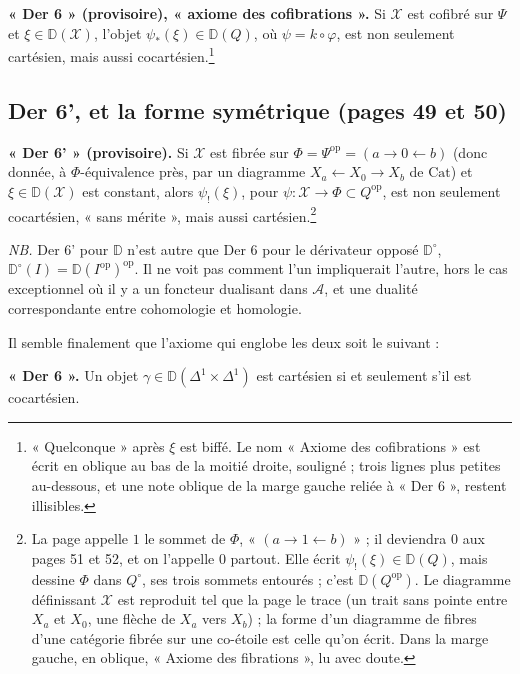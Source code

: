 \documentclass[11pt,a4paper]{article}
\begin{document}
\textbf{« Der 6 » (provisoire), « axiome des cofibrations ».} Si
$\mathcal{X}$ est cofibré sur $\Psi$ et $\xi \in \mathbb D(\mathcal{X})$,
l'objet $\psi_*(\xi) \in \mathbb D(Q)$, où $\psi = k \circ \varphi$, est non
seulement cartésien, mais aussi cocartésien.\footnote{« Quelconque » après
$\xi$ est biffé. Le nom « Axiome des cofibrations » est écrit en oblique au
bas de la moitié droite, souligné ; trois lignes plus petites au-dessous, et
une note oblique de la marge gauche reliée à « Der 6 », restent illisibles.}

\subsection*{Der 6', et la forme symétrique (pages 49 et 50)}

\textbf{« Der 6' » (provisoire).} Si $\mathcal{X}$ est fibrée sur
$\Phi = \Psi^{\mathrm{op}} = (a \to 0 \leftarrow b)$ (donc donnée, à
$\Phi$-équivalence près, par un diagramme $X_a \leftarrow X_0 \rightarrow X_b$
de $\mathrm{Cat}$) et $\xi \in \mathbb D(\mathcal{X})$ est constant, alors
$\psi_!(\xi)$, pour $\psi : \mathcal{X} \to \Phi \subset Q^{\mathrm{op}}$, est
non seulement cocartésien, « sans mérite », mais aussi
cartésien.\footnote{La page appelle $1$ le sommet de $\Phi$, « $(a \to 1
\leftarrow b)$ » ; il deviendra $0$ aux pages 51 et 52, et on l'appelle $0$
partout. Elle écrit $\psi_!(\xi) \in \mathbb D(Q)$, mais dessine
$\Phi$ dans $Q^\circ$, ses trois sommets entourés ; c'est
$\mathbb D(Q^{\mathrm{op}})$. Le diagramme définissant $\mathcal{X}$ est
reproduit tel que la page le trace (un trait sans pointe entre $X_a$ et $X_0$,
une flèche de $X_a$ vers $X_b$) ; la forme d'un diagramme de fibres d'une
catégorie fibrée sur une co-étoile est celle qu'on écrit. Dans la marge
gauche, en oblique, « Axiome des fibrations », lu avec doute.}

\emph{NB.} Der 6' pour $\mathbb D$ n'est autre que Der 6 pour le dérivateur
opposé $\mathbb D^\circ$, $\mathbb D^\circ(I) = \mathbb
D(I^{\mathrm{op}})^{\mathrm{op}}$. Il ne voit pas comment l'un impliquerait
l'autre, hors le cas exceptionnel où il y a un foncteur dualisant dans
$\mathcal{A}$, et une dualité correspondante entre cohomologie et homologie.

Il semble finalement que l'axiome qui englobe les deux soit le suivant :

\textbf{« Der 6 ».} Un objet $\gamma \in \mathbb D(\Delta^1 \times
\Delta^1)$ est cartésien si et seulement s'il est cocartésien.
\end{document}
